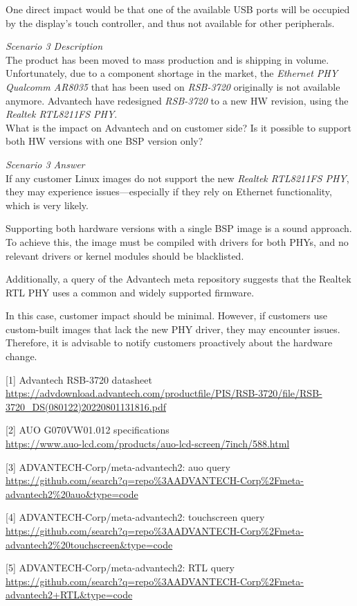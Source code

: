 {  One direct impact would be that one of the available USB ports will be occupied
  by the display’s touch controller, and thus not available for other peripherals.



  \newpage
  { \fontsize{8pt}{10pt}\textit{Scenario 3 Description}}\\
  The product has been moved to mass production and is shipping in volume.
  Unfortunately, due to a component shortage in the market, the
  \textit{Ethernet PHY Qualcomm AR8035} that has been used on \textit{RSB-3720}
  originally is not available anymore. Advantech have redesigned
  \textit{RSB-3720} to a new HW revision, using the
  \textit{Realtek RTL8211FS PHY}.\\
  What is the impact on Advantech and on customer side? Is it possible
  to support both HW versions with one BSP version only?

  { \fontsize{8pt}{10pt}\textit{Scenario 3 Answer}}\\
  If any customer Linux images do not support the new \textit{Realtek RTL8211FS PHY},
  they may experience issues—especially if they rely on Ethernet functionality, which is very likely.

  Supporting both hardware versions with a single BSP image is a sound approach.
  To achieve this, the image must be compiled with drivers for both PHYs, and no relevant
  drivers or kernel modules should be blacklisted.

  Additionally, a query of the Advantech meta repository suggests that the Realtek RTL PHY
  uses a common and widely supported firmware.

  In this case, customer impact should be minimal. However, if customers use
  custom-built images that lack the new PHY driver, they may encounter issues.
  Therefore, it is advisable to notify customers proactively about the hardware change.


  \bigskip
  \bigskip
  \bigskip

  [1] Advantech RSB-3720 datasheet\\\url{https://advdownload.advantech.com/productfile/PIS/RSB-3720/file/RSB-3720_DS(080122)20220801131816.pdf}

  [2] AUO G070VW01.012 specifications\\\url{https://www.auo-lcd.com/products/auo-lcd-screen/7inch/588.html}
  
  [3] ADVANTECH-Corp/meta-advantech2: auo query\\\url{https://github.com/search?q=repo\%3AADVANTECH-Corp\%2Fmeta-advantech2\%20auo\&type=code}
  
  [4] ADVANTECH-Corp/meta-advantech2: touchscreen query\\\url{https://github.com/search?q=repo\%3AADVANTECH-Corp\%2Fmeta-advantech2\%20touchscreen\&type=code}
  
  [5] ADVANTECH-Corp/meta-advantech2: RTL query\\\url{https://github.com/search?q=repo\%3AADVANTECH-Corp\%2Fmeta-advantech2+RTL\&type=code}

}
